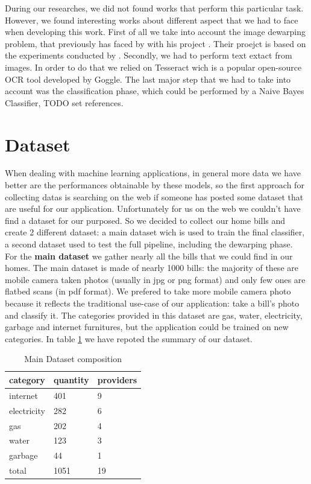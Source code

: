 \documentclass[10pt,twocolumn,letterpaper]{article}
\begin{document}
During our researches, we did not found works that perform this
particular task. However, we found interesting works about different
aspect that we had to face when developing this work.  First of all we
take into account the image dewarping problem, that previously has
faced by \cite{Improvingcamera-based} with his project
\cite{mobile-ocr}. Their proejct is based on the experiments conducted
by \cite{recoveringhomography}.  Secondly, we had to perform text
extact from images. In order to do that we relied on Tesseract
\cite{Tesseract} wich is a popular open-source OCR tool developed by
Goggle. The last major step that we had to take into account was the
classification phase, which could be performed by a Naive Bayes
Classifier, TODO set references.

\section{Dataset}
\label{sec:dataset}
When dealing with machine learning applications, in general more data we have  better are the performances obtainable by these models, so the first approach for collecting datas is searching on the web if someone has posted some dataset that are useful for our application. Unfortunately for us on the web we couldn't have find a dataset for our purposed. So we decided to collect our home bills and create 2 different dataset: a main dataset wich is used to train the final classifier, a second dataset used to test the full pipeline, including the dewarping phase.\\

For the \textbf{main dataset} we gather nearly all the bills that we could find in our homes. The main dataset is made of nearly 1000 bills: the majority of these are mobile camera taken photos (usually in jpg or png format) and only few ones are flatbed scans (in pdf format). We prefered to take more mobile camera photo because it reflects the traditional use-case of our application: take a bill's photo and classify it. The categories provided in this dataset are gas, water, electricity, garbage and internet furnitures, but the application could be trained on new categories. In table \ref{dataset-table} we have repoted the summary of our dataset.


\begin{table}[!h]
	\begin{center}
		\begin{tabular}{lll}
			\hline
			category    & quantity & providers \\ \hline
			internet    & 401      & 9         \\
			electricity & 282      & 6         \\
			gas         & 202      & 4         \\
			water       & 123      & 3         \\
			garbage     & 44       & 1         \\ \hline
			total       & 1051     & 19        \\ \hline
		\end{tabular}
	\end{center}
	\label{dataset-table}
	\caption{Main Dataset composition}
\end{table}
\end{document}
